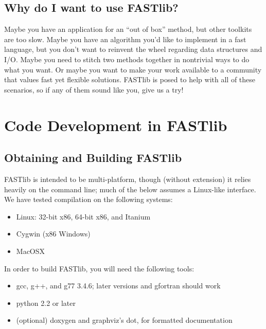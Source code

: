 \documentclass[letter]{report}
\begin{document}
\section{Why do I want to use FASTlib?} 
Maybe you have an application for an ``out of box'' method, but other
toolkits are too slow.  Maybe you have an algorithm you'd like to
implement in a fast language, but you don't want to reinvent the wheel
regarding data structures and I/O.  Maybe you need to stitch two
methods together in nontrivial ways to do what you want.  Or maybe you
want to make your work available to a community that values fast yet
flexible solutions.  FASTlib is posed to help with all of these
scenarios, so if any of them sound like you, give us a try!

\chapter {Code Development in FASTlib}

\section{Obtaining and Building FASTlib}
FASTlib is intended to be multi-platform, though (without extension)
it relies heavily on the command line; much of the below assumes a
Linux-like interface.  We have tested compilation on the following
systems:
\begin{itemize}
\item Linux: 32-bit x86, 64-bit x86, and Itanium
\item Cygwin (x86 Windows)
\item MacOSX
\end {itemize} 
In order to build FASTlib, you will need the following tools:
\begin {itemize}
\item gcc, g++, and g77 3.4.6; later versions and gfortran should work
\item python 2.2 or later
\item (optional) doxygen and graphviz's dot, for formatted documentation
\end {itemize}
\end{document}

